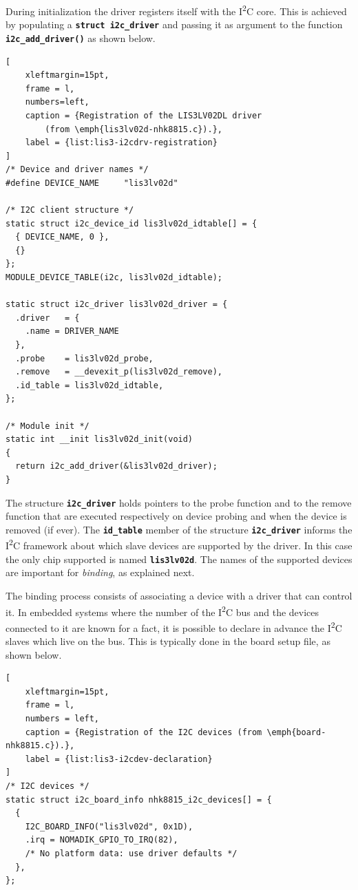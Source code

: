 \documentclass[a4paper,10pt]{article}
\newcommand{\iic}{I\textsuperscript{2}C }
\newcommand{\keyword}[1]{\texttt{\textbf{#1}}}
\begin{document}
\begin{multicols}{2}
During initialization the driver registers itself with the \iic core. This
is achieved by populating a \keyword{struct i2c\_driver} and passing it
as argument to the function \keyword{i2c\_add\_driver()} as shown below.

\begin{lstlisting}[
	xleftmargin=15pt,
	frame = l,
	numbers=left,
	caption = {Registration of the LIS3LV02DL driver
		(from \emph{lis3lv02d-nhk8815.c}).},
	label = {list:lis3-i2cdrv-registration}
]
/* Device and driver names */
#define	DEVICE_NAME		"lis3lv02d"

/* I2C client structure */
static struct i2c_device_id lis3lv02d_idtable[] = {
  { DEVICE_NAME, 0 },
  {}
};
MODULE_DEVICE_TABLE(i2c, lis3lv02d_idtable);

static struct i2c_driver lis3lv02d_driver = {
  .driver   = {
    .name = DRIVER_NAME
  },
  .probe    = lis3lv02d_probe,
  .remove   = __devexit_p(lis3lv02d_remove),
  .id_table = lis3lv02d_idtable,
};

/* Module init */
static int __init lis3lv02d_init(void)
{
  return i2c_add_driver(&lis3lv02d_driver);
}
\end{lstlisting}

The structure \keyword{i2c\_driver} holds pointers to the probe function
and to the remove function that are executed respectively on device probing
and when the device is removed (if ever).
The \keyword{id\_table} member of the structure \keyword{i2c\_driver} informs
the \iic framework about which slave devices are supported by the driver.
In this case the only chip supported is named \keyword{lis3lv02d}.
The names of the supported devices are important for \emph{binding}, as
explained next.

The binding process consists of associating a device with a driver that can
control it. In embedded systems where the number of the \iic bus and the
devices connected to it are known for a fact, it is possible to declare in
advance the \iic slaves which live on the bus. This is typically done in the
board setup file, as shown below.

\begin{lstlisting}[
	xleftmargin=15pt,
	frame = l,
	numbers = left,
	caption = {Registration of the I2C devices (from \emph{board-nhk8815.c}).},
	label = {list:lis3-i2cdev-declaration}
]
/* I2C devices */
static struct i2c_board_info nhk8815_i2c_devices[] = {
  {
    I2C_BOARD_INFO("lis3lv02d", 0x1D),
    .irq = NOMADIK_GPIO_TO_IRQ(82),
    /* No platform data: use driver defaults */
  },
};


\end{lstlisting}
\end{multicols}
\end{document}
